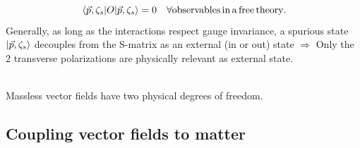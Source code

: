 \begin{equation}
	\expval{O}{\vec{p},\zeta_s} = 0 \quad \forall \mathrm{observables \, in \, a \, free \, theory.}
	\end{equation}
Generally, as long as the interactions respect gauge invariance, a spurious state $\ket{\vec{p},\zeta_s}$ decouples from the S-matrix as an external (in or out) state $\Rightarrow$ Only the 2 transverse polarizations are physically relevant as external state.
\\
\\
\begin{statements}
	Massless vector fields have two physical degrees of freedom.
\end{statements}



\subsection{Coupling vector fields to matter}

